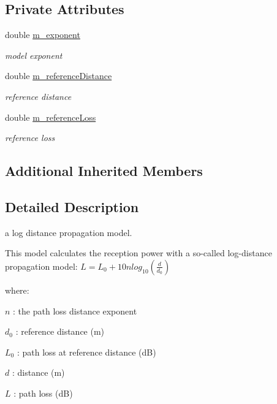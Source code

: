 \subsection*{Private Attributes}
\begin{DoxyCompactItemize}
\item 
double \hyperlink{classns3_1_1LogDistancePropagationLossModel_a70538e0d462564ad358ead5ab67aa3db}{m\+\_\+exponent}
\begin{DoxyCompactList}\small\item\em model exponent \end{DoxyCompactList}\item 
double \hyperlink{classns3_1_1LogDistancePropagationLossModel_a1e40651f77e1aa2226eac1668b5bc22c}{m\+\_\+reference\+Distance}
\begin{DoxyCompactList}\small\item\em reference distance \end{DoxyCompactList}\item 
double \hyperlink{classns3_1_1LogDistancePropagationLossModel_ad5065bb57e5dc5863189ab6e014080a0}{m\+\_\+reference\+Loss}
\begin{DoxyCompactList}\small\item\em reference loss \end{DoxyCompactList}\end{DoxyCompactItemize}
\subsection*{Additional Inherited Members}


\subsection{Detailed Description}
a log distance propagation model. 

This model calculates the reception power with a so-\/called log-\/distance propagation model\+: $ L = L_0 + 10 n log_{10}(\frac{d}{d_0})$

where\+:
\begin{DoxyItemize}
\item $ n $ \+: the path loss distance exponent
\item $ d_0 $ \+: reference distance (m)
\item $ L_0 $ \+: path loss at reference distance (dB)
\item $ d $ \+: distance (m)
\item $ L $ \+: path loss (dB)
\end{DoxyItemize}

